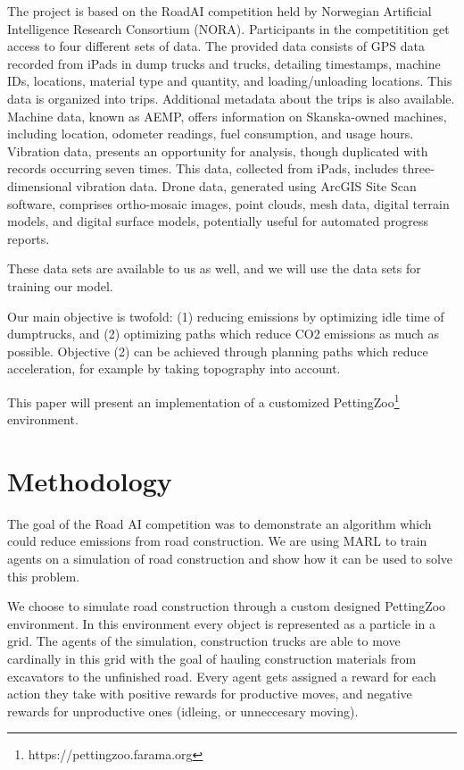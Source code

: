 \documentclass[conference]{IEEEtran}
\begin{document}
The project is based on the RoadAI competition held by Norwegian Artificial Intelligence Research
Consortium (NORA)\cite{noraRoadAIReducing}. Participants in the competitition get access to four
different sets of data. The provided data consists of GPS data recorded from iPads in dump trucks and
trucks, detailing timestamps, machine IDs, locations, material type and quantity, and loading/unloading
locations. This data is organized into trips. Additional metadata about the trips is also available.
Machine data, known as AEMP, offers information on Skanska-owned machines, including location,
odometer readings, fuel consumption, and usage hours. Vibration data, presents an opportunity for analysis, though duplicated with records occurring seven times. This data, collected from
iPads, includes three-dimensional vibration data. Drone data, generated using ArcGIS Site Scan software,
comprises ortho-mosaic images, point clouds, mesh data, digital terrain models, and digital surface models,
potentially useful for automated progress reports.

These data sets are available to us as well, and we will use the data sets for training our model.

Our main objective is twofold: (1) reducing emissions by optimizing idle time of dumptrucks, and (2)
optimizing paths which reduce CO2 emissions as much as possible. Objective (2) can be achieved through
planning paths which reduce acceleration, for example by taking topography into account.

This paper will present an implementation of a customized PettingZoo\footnote{https://pettingzoo.farama.org}
environment.


\section{Methodology}

The goal of the Road AI competition was to demonstrate an algorithm which could reduce emissions from road construction.
We are using MARL to train agents on a simulation of road construction and show how it can be used to solve this problem.

We choose to simulate road construction through a custom designed PettingZoo environment.
In this environment every object is represented as a particle in a grid. 
The agents of the simulation, construction trucks are able to move cardinally in this grid with the goal of hauling construction materials from excavators to the unfinished road. 
Every agent gets assigned a reward for each action they take with positive rewards for productive moves, and negative rewards for unproductive ones (idleing, or unneccesary moving). 
\end{document}
